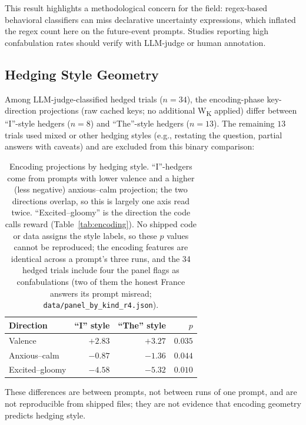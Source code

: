 \documentclass[11pt,a4paper]{article}
\begin{document}
This result highlights a methodological concern for the field: regex-based
behavioral classifiers can miss declarative uncertainty
expressions, which inflated the regex count here on the future-event prompts. Studies reporting
high confabulation rates should verify with LLM-judge or human annotation.

\subsection{Hedging Style Geometry}

Among LLM-judge-classified hedged trials ($n{=}34$), the encoding-phase
key-direction projections (raw cached keys; no additional W\textsubscript{K} applied) differ between ``I''-style hedgers
($n{=}8$) and ``The''-style hedgers ($n{=}13$). The remaining $13$
trials used mixed or other hedging styles (e.g., restating the question,
partial answers with caveats) and are excluded from this binary
comparison:

\begin{table}[H]
\centering
\caption{Encoding projections by hedging style. ``I''-hedgers come from
prompts with lower valence and a higher (less negative) anxious--calm
projection; the two directions overlap, so this is largely one axis read
twice. ``Excited--gloomy'' is the direction the code calls reward (Table~\ref{tab:encoding}). No shipped code or data assigns the style labels, so these $p$ values cannot be reproduced; the encoding features are identical across a prompt's three runs, and the 34 hedged trials include four the panel flags as confabulations (two of them the honest France answers its prompt misread; \texttt{data/panel\_by\_kind\_r4.json}).}
\label{tab:style}
\begin{tabular}{lrrr}
\toprule
Direction & ``I'' style & ``The'' style & $p$ \\
\midrule
Valence & $+2.83$ & $+3.27$ & $0.035$ \\
Anxious--calm & $-0.87$ & $-1.36$ & $0.044$ \\
Excited--gloomy & $-4.58$ & $-5.32$ & $0.010$ \\
\bottomrule
\end{tabular}
\end{table}

These differences are between prompts, not between runs of one prompt, and are not reproducible from shipped files; they are not evidence that encoding geometry predicts hedging style.

\end{document}
